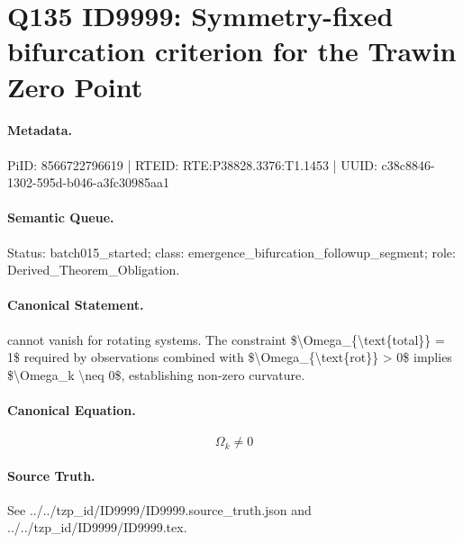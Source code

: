 \section*{Q135 ID9999: Symmetry-fixed bifurcation criterion for the Trawin Zero Point}
\paragraph{Metadata.}
PiID: 8566722796619 | RTEID: RTE:P38828.3376:T1.1453 | UUID: c38c8846-1302-595d-b046-a3fc30985aa1

\paragraph{Semantic Queue.}
Status: batch015\_started; class: emergence\_bifurcation\_followup\_segment; role: Derived\_Theorem\_Obligation.

\paragraph{Canonical Statement.}
cannot vanish for rotating systems. The constraint \$\textbackslash{}Omega\_\{\textbackslash{}text\{total\}\} = 1\$ required by observations combined with \$\textbackslash{}Omega\_\{\textbackslash{}text\{rot\}\} > 0\$ implies \$\textbackslash{}Omega\_k \textbackslash{}neq 0\$, establishing non-zero curvature.

\paragraph{Canonical Equation.}
\[
\Omega_k \neq 0
\]

\paragraph{Source Truth.}
See ../../tzp\_id/ID9999/ID9999.source\_truth.json and ../../tzp\_id/ID9999/ID9999.tex.
